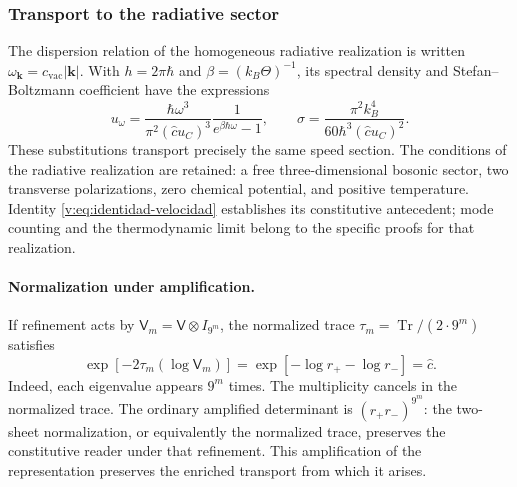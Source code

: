 \subsubsection{Transport to the radiative sector}

The dispersion relation of the homogeneous radiative realization is written
$\omega_{\symbf{k}}=c_{\mathrm{vac}}|\symbf{k}|$.
With $h=2\pi\hbar$ and $\beta=(k_B\Theta)^{-1}$, its spectral density
and Stefan--Boltzmann coefficient have the expressions
\begin{equation}
 u_\omega=
 \frac{\hbar\omega^3}{\pi^2(\widehat c u_C)^3}
 \frac{1}{e^{\beta\hbar\omega}-1},
 \qquad
 \sigma=\frac{\pi^2k_B^4}{60\hbar^3(\widehat c u_C)^2}.
 \label{v:eq:radiacion-velocidad-constitutiva}
\end{equation}
These substitutions transport precisely the same speed
section. The conditions of the radiative realization are retained:
a free three-dimensional bosonic sector, two transverse polarizations,
zero chemical potential, and positive temperature. Identity
\eqref{v:eq:identidad-velocidad} establishes its constitutive antecedent;
mode counting and the thermodynamic limit belong to the specific
proofs for that realization.

\paragraph{Normalization under amplification.}
If refinement acts by $\mathsf V_m=\mathsf V\otimes I_{9^m}$,
the normalized trace $\tau_m=\operatorname{Tr}/(2\cdot9^m)$ satisfies
\[
 \exp[-2\tau_m(\log\mathsf V_m)]
 =\exp[-\log r_+-\log r_-]=\widehat c.
\]
Indeed, each eigenvalue appears $9^m$ times. The multiplicity
cancels in the normalized trace. The ordinary amplified determinant is
$(r_+r_-)^{9^m}$: the two-sheet normalization, or equivalently the
normalized trace, preserves the constitutive reader under that
refinement. This amplification of the representation preserves the
enriched transport from which it arises.
